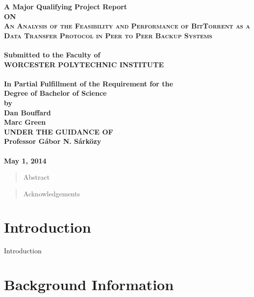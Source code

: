 \documentclass[12pt]{report}
\begin{document}
\newpage
\begin{center}
\thispagestyle{empty}
\Large{\textbf{A Major Qualifying Project Report\\ \large{ON}}}\\[0.7cm]
\LARGE{\textsc {\textbf{An Analysis of the Feasibility and Performance of BitTorrent as a Data Transfer Protocol in Peer to Peer Backup Systems}}}\\[0.5cm]
\vspace{0.2cm}
\Large{\textbf{\\Submitted to the Faculty of }}
\LARGE{\textbf{\\WORCESTER POLYTECHNIC INSTITUTE\\}}
\vspace{0.5cm}
\Large{\textbf{\\In Partial Fulfillment of the Requirement for the}}
\Large{\textbf{\\Degree of Bachelor of Science}}
\vspace{0.5cm}
\Large{\textbf{\\by}}\\[0.5cm]
\large{\textbf{Dan Bouffard}}\\
\large{\textbf{Marc Green}}\\
\vspace{0.5cm}
\large{\textbf{UNDER THE GUIDANCE OF}}\\
\large{\textbf{Professor G\'abor N. S\'ark\"ozy}}\\
\vspace{1cm}
\large{\textbf{\\May 1, 2014}}\\
\newpage
\end{center}


\begin{abstract}
Abstract
\end{abstract}

\renewcommand{\abstractname}{Acknowledgements}
\begin{abstract}
Acknowledgements
\end{abstract}

\tableofcontents
\listoffigures

\chapter{Introduction}

Introduction


\chapter{Background Information}
\end{document}
